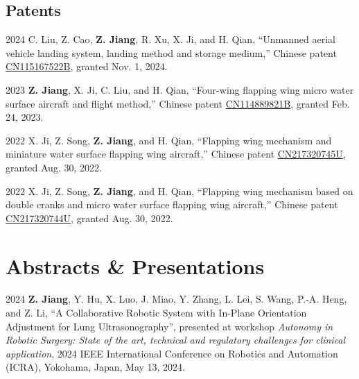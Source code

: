 \documentclass[11pt,letterpaper]{report}
\begin{document}
\subsection*{Patents}
\begin{tablist}	
	\item[2024]   \tab{}C. Liu, Z. Cao, \textbf{Z. Jiang}, R. Xu, X. Ji, and H. Qian, ``Unmanned aerial vehicle landing system, landing method and storage medium,'' Chinese patent \href{https://patents.google.com/patent/CN115167522A/en?oq=CN115167522A}{CN115167522B}, granted Nov. 1, 2024.	
		
	\item[2023]   \tab{}\textbf{Z. Jiang}, X. Ji, C. Liu, and H. Qian, ``Four-wing flapping wing micro water surface aircraft and flight method,'' Chinese patent \href{https://patents.google.com/patent/CN114889821B/en?oq=CN114889821B}{CN114889821B}, granted Feb. 24, 2023.
		
	\item[2022]   \tab{}X. Ji, Z. Song, \textbf{Z. Jiang}, and H. Qian, ``Flapping wing mechanism and miniature water surface flapping wing aircraft,'' Chinese patent \href{https://patents.google.com/patent/CN217320745U/en?oq=CN217320745U}{CN217320745U}, granted Aug. 30, 2022.  
		
	\item[2022]   \tab{}X. Ji, Z. Song, \textbf{Z. Jiang}, and H. Qian, ``Flapping wing mechanism based on double cranks and micro water surface flapping wing aircraft,'' Chinese patent \href{https://patents.google.com/patent/CN217320744U/en?oq=CN217320744U}{CN217320744U}, granted Aug. 30, 2022.  
\end{tablist}
	
	
	
\section*{Abstracts \& Presentations}
\begin{tablist}
	\item[2024] \tab \textbf{Z. Jiang}, Y. Hu, X. Luo, J. Miao, Y. Zhang, L. Lei, S. Wang, P.-A. Heng, and Z. Li, ``A Collaborative Robotic System with In-Plane Orientation Adjustment for Lung Ultrasonography'', presented at workshop \textit{Autonomy in Robotic Surgery: State of the art, technical and regulatory challenges for clinical application}, 2024 IEEE International Conference on Robotics and Automation (ICRA), Yokohama, Japan, May 13, 2024.
\end{tablist}
	
\end{document}
